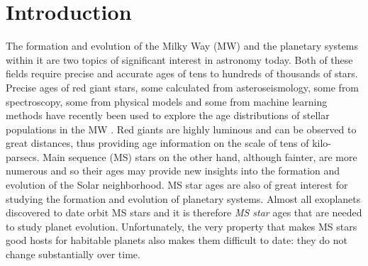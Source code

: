 \section{Introduction}
\label{section:intro}


The formation and evolution of the Milky Way (MW) and the planetary systems
within it are two topics of significant interest in astronomy today.
Both of these fields require precise and accurate ages of tens to hundreds of
thousands of stars.
Precise ages of red giant stars, some calculated from asteroseismology, some
from spectroscopy, some from physical models and some from machine learning
methods have recently been used to explore the age distributions of stellar
populations in the MW \citep[\eg][]{ness2015, stello2017, das2018,
sanders2018}.
Red giants are highly luminous and can be observed to great distances, thus
providing age information on the scale of tens of kilo-parsecs.
Main sequence (MS) stars on the other hand, although fainter, are more
numerous and so their ages may provide new insights into the formation and
evolution of the Solar neighborhood.
MS star ages are also of great interest for studying the formation and
evolution of planetary systems.
Almost all exoplanets discovered to date orbit MS stars and it is therefore
{\it MS star} ages that are needed to study planet evolution.
Unfortunately, the very property that makes MS stars good hosts for habitable
planets also makes them difficult to date: they do not change substantially
over time.

